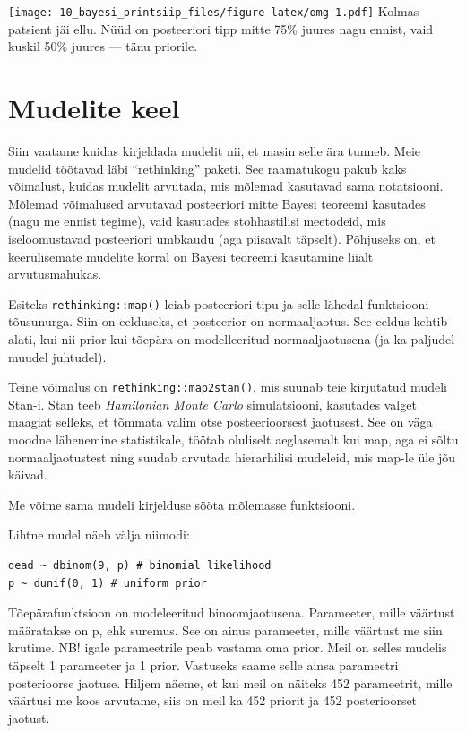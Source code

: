 \documentclass[]{book}
\begin{document}
\texttt{[image: 10\_bayesi\_printsiip\_files/figure-latex/omg-1.pdf]}
Kolmas patsient jäi ellu. Nüüd on posteeriori tipp mitte 75\% juures nagu ennist, vaid kuskil 50\% juures --- tänu priorile.

\hypertarget{mudelite-keel}{%
\chapter{Mudelite keel}\label{mudelite-keel}}

Siin vaatame kuidas kirjeldada mudelit nii, et masin selle ära tunneb.
Meie mudelid töötavad läbi ``rethinking'' paketi.
See raamatukogu pakub kaks võimalust, kuidas mudelit arvutada, mis mõlemad kasutavad sama notatsiooni.
Mõlemad võimalused arvutavad posteeriori mitte Bayesi teoreemi kasutades (nagu me ennist tegime), vaid kasutades stohhastilisi meetodeid, mis iseloomustavad posteeriori umbkaudu (aga piisavalt täpselt).
Põhjuseks on, et keerulisemate mudelite korral on Bayesi teoreemi kasutamine liialt arvutusmahukas.

Esiteks \texttt{rethinking::map()} leiab posteeriori tipu ja selle lähedal funktsiooni tõusunurga.
Siin on eelduseks, et posteerior on normaaljaotus.
See eeldus kehtib alati, kui nii prior kui tõepära on modelleeritud normaaljaotusena (ja ka paljudel muudel juhtudel).

Teine võimalus on \texttt{rethinking::map2stan()}, mis suunab teie kirjutatud mudeli Stan-i.
Stan teeb \emph{Hamilonian Monte Carlo} simulatsiooni, kasutades valget maagiat selleks, et tõmmata valim otse posteerioorsest jaotusest.
See on väga moodne lähenemine statistikale, töötab oluliselt aeglasemalt kui map, aga ei sõltu normaaljaotustest ning suudab arvutada hierarhilisi mudeleid, mis map-le üle jõu käivad.

Me võime sama mudeli kirjelduse sööta mõlemasse funktsiooni.

Lihtne mudel näeb välja niimodi:

\begin{verbatim}
dead ~ dbinom(9, p) # binomial likelihood
p ~ dunif(0, 1) # uniform prior
\end{verbatim}

Tõepärafunktsioon on modeleeritud binoomjaotusena.
Parameeter, mille väärtust määratakse on p, ehk suremus.
See on ainus parameeter, mille väärtust me siin krutime.
NB! igale parameetrile peab vastama oma prior.
Meil on selles mudelis täpselt 1 parameeter ja 1 prior.
Vastuseks saame selle ainsa parameetri posterioorse jaotuse.
Hiljem näeme, et kui meil on näiteks 452 parameetrit, mille väärtusi me koos arvutame, siis on meil ka 452 priorit ja 452 posterioorset jaotust.
\end{document}
